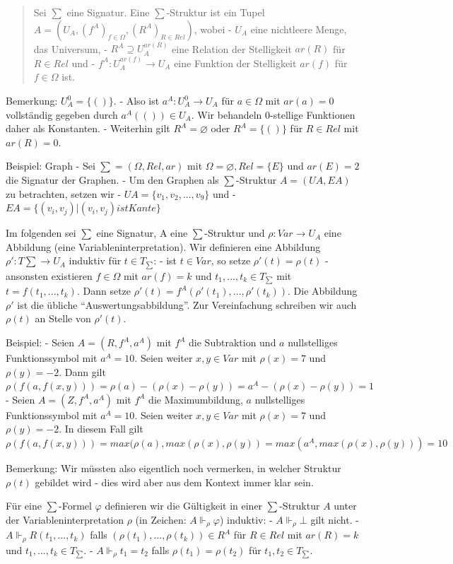 \documentclass[a4paper]{article}
\begin{document}
\begin{multicols}{3}
\begin{quote}
    Sei $\sum$ eine Signatur. Eine $\sum$-Struktur ist ein Tupel
    $A=(U_A,(f^A)_{f\in\Omega},(R^A)_{R\in Rel})$, wobei - $U_A$ eine
    nichtleere Menge, das Universum, - $R^A\supseteq U_A^{ar(R)}$ eine
    Relation der Stelligkeit $ar(R)$ für $R\in Rel$ und -
    $f^A:U_A^{ar(f)}\rightarrow U_A$ eine Funktion der Stelligkeit $ar(f)$
    für $f\in\Omega$ ist.
  \end{quote}

  Bemerkung: $U_A^0=\{()\}$. - Also ist $a^A:U_A^0\rightarrow U_A$ für
  $a\in\Omega$ mit $ar(a)=0$ vollständig gegeben durch $a^A(())\in U_A$.
  Wir behandeln 0-stellige Funktionen daher als Konstanten. - Weiterhin
  gilt $R^A=\varnothing$ oder $R^A=\{()\}$ für $R\in Rel$ mit $ar(R)=0$.

  Beispiel: Graph - Sei $\sum=(\Omega ,Rel,ar)$ mit
  $\Omega=\varnothing ,Rel=\{E\}$ und $ar(E)=2$ die Signatur der Graphen.
  - Um den Graphen als $\sum$-Struktur $A=(UA,EA)$ zu betrachten, setzen
  wir - $UA=\{v_1,v_2,...,v_9\}$ und -
  $EA=\{(v_i,v_j)|(v_i,v_j) ist Kante\}$

  Im folgenden sei $\sum$ eine Signatur, A eine $\sum$-Struktur und
  $\rho:Var\rightarrow U_A$ eine Abbildung (eine Variableninterpretation).
  Wir definieren eine Abbildung $\rho':T\sum\rightarrow U_A$ induktiv für
  $t\in T_{\sum}$: - ist $t\in Var$, so setze $\rho'(t) =\rho(t)$ -
  ansonsten existieren $f\in\Omega$ mit $ar(f)=k$ und
  $t_1,...,t_k\in T_{\sum}$ mit $t=f(t_1,...,t_k)$. Dann setze
  $\rho'(t) =f^A(\rho'(t_1),...,\rho'(t_k))$. Die Abbildung $\rho'$ ist
  die übliche ``Auswertungsabbildung''. Zur Vereinfachung schreiben wir
  auch $\rho(t)$ an Stelle von $\rho'(t)$.

  Beispiel: - Seien $A=(R,f^A,a^A)$ mit $f^A$ die Subtraktion und $a$
  nullstelliges Funktionssymbol mit $a^A=10$. Seien weiter $x,y\in Var$
  mit $\rho(x)=7$ und $\rho(y)=-2$. Dann gilt
  $\rho(f(a,f(x,y))) =\rho(a)-(\rho(x)-\rho(y)) =a^A-(\rho(x)-\rho(y)) = 1$
  - Seien $A= (Z,f^A,a^A)$ mit $f^A$ die Maximumbildung, $a$ nullstelliges
  Funktionssymbol mit $a^A=10$. Seien weiter $x,y\in Var$ mit $\rho(x)=7$
  und $\rho(y)=-2$. In diesem Fall gilt
  $\rho(f(a,f(x,y))) = max(\rho(a),max(\rho(x),\rho(y)) = max(a^A,max(\rho(x),\rho(y))) = 10$

  Bemerkung: Wir müssten also eigentlich noch vermerken, in welcher
  Struktur $\rho(t)$ gebildet wird - dies wird aber aus dem Kontext immer
  klar sein.

  Für eine $\sum$-Formel $\varphi$ definieren wir die Gültigkeit in einer
  $\sum$-Struktur $A$ unter der Variableninterpretation $\rho$ (in
  Zeichen: $A\Vdash_\rho\varphi$) induktiv: - $A\Vdash_\rho\bot$ gilt
  nicht. - $A\Vdash_\rho R(t_1,...,t_k)$ falls
  $(\rho(t_1),...,\rho(t_k))\in R^A$ für $R\in Rel$ mit $ar(R)=k$ und
  $t_1,...,t_k\in T_{\sum}$. - $A\Vdash_\rho t_1 =t_2$ falls
  $\rho(t_1) =\rho(t_2)$ für $t_1,t_2\in T_{\sum}$.


\end{multicols}
\end{document}
